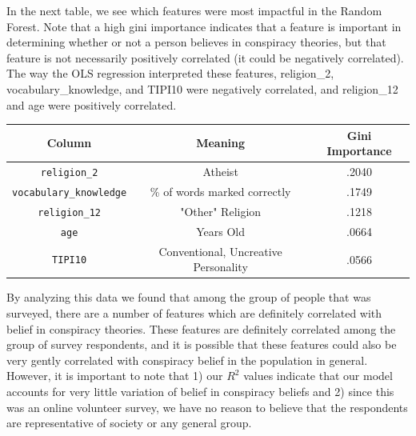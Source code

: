 \documentclass{article}[11pt]
\begin{document}
In the next table, we see which features were most impactful in the
Random Forest. Note that a high gini importance indicates that a feature
is important in determining whether or not a person believes in
conspiracy theories, but that feature is not necessarily positively
correlated (it could be negatively correlated). The way the OLS
regression interpreted these features, religion\_2,
vocabulary\_knowledge, and TIPI10 were negatively correlated, and
religion\_12 and age were positively correlated.

\begin{center}
\begin{tabular}{ |c|c|c| } 
   \hline
   Column & Meaning & Gini Importance \\ 
   \hline
   \verb|religion_2| & Atheist & .2040 \\ 
   \verb|vocabulary_knowledge| & \% of words marked correctly & .1749 \\ 
   \verb|religion_12| & "Other" Religion & .1218 \\ 
   \verb|age| & Years Old & .0664 \\ 
   \verb|TIPI10| & Conventional, Uncreative Personality & .0566 \\ 
   \hline
\end{tabular}
\end{center}

By analyzing this data we found that among the group of people that was
surveyed, there are a number of features which are definitely correlated
with belief in conspiracy theories. These features are definitely
correlated among the group of survey respondents, and it is possible
that these features could also be very gently correlated with conspiracy
belief in the population in general. However, it is important to note
that 1) our \(R^2\) values indicate that our model accounts for very
little variation of belief in conspiracy beliefs and 2) since this was
an online volunteer survey, we have no reason to believe that the
respondents are representative of society or any general group.
\end{document}
